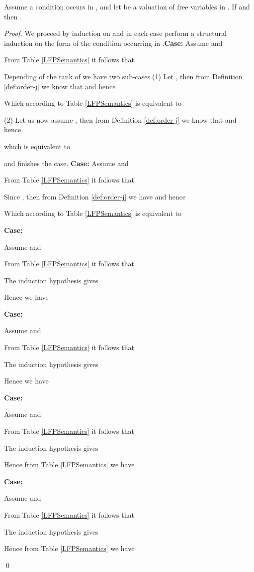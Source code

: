 \begin{lemma}\label{lemma:cond}
  Assume a condition  occurs in , and let  be
  a valuation of free variables in . If  and 
  then .
\end{lemma}
\begin{proof}
  We proceed by induction on  and in each case perform a structural
  induction on the form of the condition  occurring in
  .\newline \textbf{Case: } \newline Assume
   and

From Table \ref{LFPSemantics} it follows that

Depending of the rank of  we have two sub-cases.\newline (1) Let
, then from Definition \ref{def:order-j} we know that
 and hence

Which according to Table \ref{LFPSemantics} is equivalent to

(2) Let us now assume , then from Definition
\ref{def:order-j} we know that  and hence

which is equivalent to

and finishes the case. \newline \textbf{Case: }
\newline Assume  and

From Table \ref{LFPSemantics} it follows that

Since , then from Definition \ref{def:order-j} we have
 and hence

Which according to Table \ref{LFPSemantics} is equivalent to


\noindent \textbf{Case: }

\noindent Assume  and

From Table \ref{LFPSemantics} it follows that

The induction hypothesis gives

Hence we have 


\noindent \textbf{Case: }

\noindent Assume  and

From Table \ref{LFPSemantics} it follows that

The induction hypothesis gives

Hence we have 


\noindent \textbf{Case: }

\noindent Assume  and

From Table \ref{LFPSemantics} it follows that

The induction hypothesis gives

Hence from Table \ref{LFPSemantics} we have


\noindent \textbf{Case: }

\noindent Assume  and

From Table \ref{LFPSemantics} it follows that

The induction hypothesis gives

Hence from Table \ref{LFPSemantics} we have

\qed
\end{proof}

